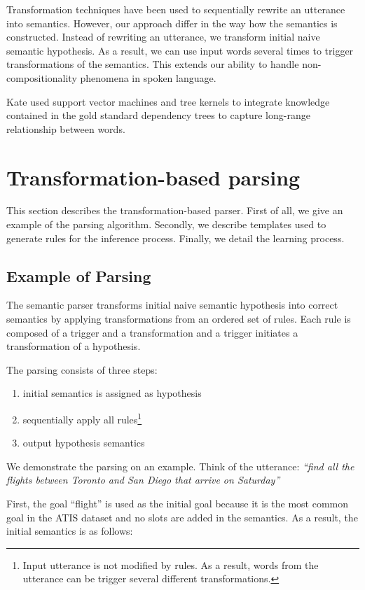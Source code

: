 \documentclass{article}
\begin{document}
Transformation techniques \cite{kate05} have been used to sequentially rewrite an utterance into semantics. However, our approach differ in the way how the semantics is constructed. Instead of rewriting an utterance, we transform initial naive semantic hypothesis. As a result, we can use input words several times to trigger transformations of the semantics. This extends our ability to handle non-compositionality phenomena in spoken language.

Kate \cite{kate08} used support vector machines and tree kernels to integrate knowledge contained in the gold standard dependency trees to capture long-range relationship between words. 

\section{Transformation-based parsing} \label{sec:tbl}
This section describes the transformation-based parser. First of all, we give an example of the parsing algorithm. Secondly, we describe  templates used to generate rules for the inference process. Finally, we detail the learning process. 

\subsection{Example of Parsing} \label{sec:tbl:example}
The semantic parser transforms initial naive semantic hypothesis into correct semantics by applying transformations from an ordered set of rules. Each rule is composed of a trigger and a transformation and a trigger initiates a transformation of a hypothesis.

The parsing consists of three steps: 
\begin{enumerate}
  \item initial semantics is assigned as hypothesis
  \item sequentially apply all rules\footnote{Input utterance is not modified by rules. As a result, words from the utterance can be trigger several different transformations.}
  \item output hypothesis semantics
\end{enumerate}

We demonstrate the parsing on an example. Think of the utterance: \textit{``find all the flights between Toronto and San Diego that arrive on Saturday''} 

First, the goal ``flight'' is used as the initial goal because it is the most common goal in the ATIS dataset and no slots are added in the semantics. As a result, the initial semantics is as follows:
\end{document}
